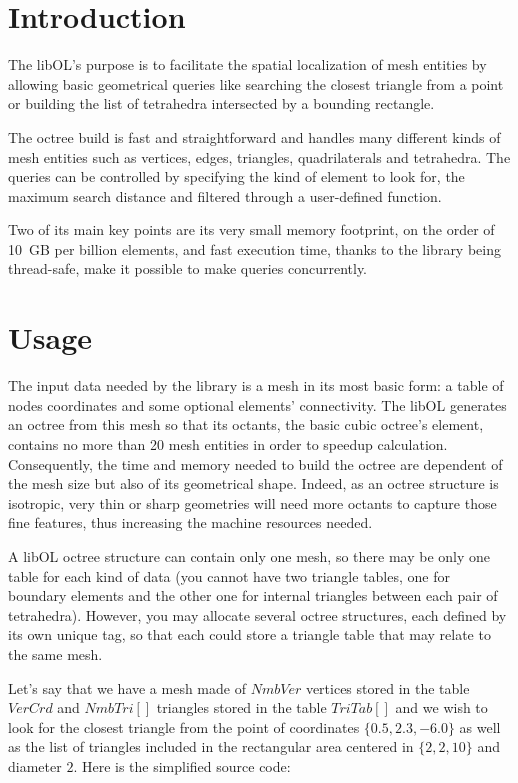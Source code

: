 \documentclass[a4paper,12pt]{article}
\begin{document}
%
%

\section{Introduction}
The libOL's purpose is to facilitate the spatial localization of mesh entities by allowing basic geometrical queries like searching the closest triangle from a point or building the list of tetrahedra intersected by a bounding rectangle.

The octree build is fast and straightforward and handles many different kinds of mesh entities such as vertices, edges, triangles, quadrilaterals and tetrahedra. The queries can be controlled by specifying the kind of element to look for, the maximum search distance and filtered through a user-defined function.

Two of its main key points are its very small memory footprint, on the order of 10 GB per billion elements, and fast execution time, thanks to the library being thread-safe, make it possible to make queries concurrently.


%
%

\section{Usage}
The input data needed by the library is a mesh in its most basic form: a table of nodes coordinates and some optional elements' connectivity. The libOL generates an octree from this mesh so that its octants, the basic cubic octree's element, contains no more than 20 mesh entities in order to speedup calculation. Consequently, the time and memory needed to build the octree are dependent of the mesh size but also of its geometrical shape. Indeed, as an octree structure is isotropic, very thin or sharp geometries will need more octants to capture those fine features, thus increasing the machine resources needed.

A libOL octree structure can contain only one mesh, so there may be only one table for each kind of data (you cannot have two triangle tables, one for boundary elements and the other one for internal triangles between each pair of tetrahedra). However, you may allocate several octree structures, each defined by its own unique tag, so that each could store a triangle table that may relate to the same mesh.

Let's say that we have a mesh made of $NmbVer$ vertices stored in the table $VerCrd$ and $NmbTri[]$ triangles stored in the table $TriTab[]$ and we wish to look for the closest triangle from the point of coordinates $\{0.5, 2.3, -6.0\}$ as well as the list of triangles included in the rectangular area centered in $\{2,2,10\}$ and diameter $2$. Here is the simplified source code:
\end{document}
